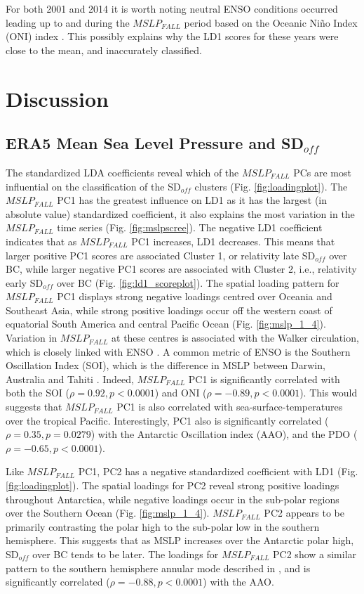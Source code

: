 \documentclass{tATO2e}
\newcommand{\sdoff}{SD$_{off}$}
\begin{document}
For both 2001 and 2014 it is worth noting neutral ENSO conditions occurred leading up to and during the $MSLP_{FALL}$ period based on the Oceanic Ni\~{n}o Index (ONI) index \citep{Huang2017-ut}. This possibly explains why the LD1 scores for these years were close to the mean, and inaccurately classified.

\section{Discussion}

\subsection{ERA5 Mean Sea Level Pressure and \sdoff{}}
The standardized LDA coefficients reveal which of the $MSLP_{FALL}$ PCs are most influential on the classification of the \sdoff{} clusters (Fig. \ref{fig:loadingplot}). The $MSLP_{FALL}$ PC1 has the greatest influence on LD1 as it has the largest (in absolute value) standardized coefficient, it also explains the most variation in the $MSLP_{FALL}$ time series (Fig. \ref{fig:mslpscree}). The negative LD1 coefficient indicates that as $MSLP_{FALL}$ PC1 increases, LD1 decreases. This means that larger positive PC1 scores are associated Cluster 1, or relativity late \sdoff{} over BC, while larger negative PC1 scores are associated with Cluster 2, i.e., relativity early \sdoff{} over BC (Fig. \ref{fig:ld1_scoreplot}). The spatial loading pattern for $MSLP_{FALL}$ PC1 displays strong negative loadings centred over Oceania and Southeast Asia, while strong positive loadings occur off the western coast of equatorial South America and central Pacific Ocean (Fig. \ref{fig:mslp_1_4}). Variation in $MSLP_{FALL}$ at these centres is associated with the Walker circulation, which is closely linked with ENSO \citep{Horel1981}. A common metric of ENSO is the Southern Oscillation Index (SOI), which is the difference in MSLP between Darwin, Australia and Tahiti \citep{Trenberth1976}. Indeed, $MSLP_{FALL}$ PC1 is significantly correlated with both the SOI ($\rho = 0.92, p < 0.0001$) and ONI ($\rho = -0.89, p < 0.0001$). This would suggests that $MSLP_{FALL}$ PC1 is also correlated with sea-surface-temperatures over the tropical Pacific. Interestingly, PC1 also is significantly correlated ($\rho = 0.35, p = 0.0279$) with the Antarctic Oscillation index (AAO), and the PDO ($\rho = -0.65, p < 0.0001$).
\par
Like $MSLP_{FALL}$ PC1, PC2 has a negative standardized coefficient with LD1 (Fig. \ref{fig:loadingplot}). The spatial loadings for PC2 reveal strong positive loadings throughout Antarctica, while negative loadings occur in the sub-polar regions over the Southern Ocean (Fig. \ref{fig:mslp_1_4}). $MSLP_{FALL}$ PC2 appears to be primarily contrasting the polar high to the sub-polar low in the southern hemisphere. This suggests that as MSLP increases over the Antarctic polar high, \sdoff{} over BC tends to be later. The loadings for $MSLP_{FALL}$ PC2 show a similar pattern to the southern hemisphere annular mode described in \cite{Thompson2000}, and is significantly correlated ($\rho = -0.88, p < 0.0001$) with the AAO.   
\end{document}
